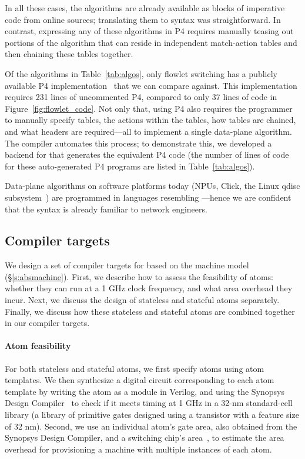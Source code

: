 In all these cases, the algorithms are already available as blocks of
imperative code from online sources; translating them to \pktlanguage syntax
was straightforward. In contrast, expressing any of these algorithms in P4
requires manually teasing out portions of the algorithm that can reside in
independent match-action tables and then chaining these tables together.

Of the algorithms in Table~\ref{tab:algos}, only flowlet switching has a
publicly available P4 implementation~\cite{p4_flowlet} that we can compare
against. This implementation requires 231 lines of uncommented P4, compared to
only 37 lines of \pktlanguage code in Figure~\ref{fig:flowlet_code}. Not only
that, using P4 also requires the programmer to manually specify tables, the
actions within the tables, how tables are chained, and what headers are
required---all to implement a single data-plane algorithm. The \pktlanguage
compiler automates this process; to demonstrate this, we developed a backend
for \pktlanguage that generates the equivalent P4 code (the number of lines of
code for these auto-generated P4 programs are listed in Table~\ref{tab:algos}).

Data-plane algorithms on software platforms today (NPUs, Click, the Linux qdisc
subsystem~\cite{qdisc})  are programmed in languages resembling
\pktlanguage---hence we are confident that the \pktlanguage syntax is already
familiar to network engineers.

\subsection{Compiler targets}
\label{ss:targets}

We design a set of compiler targets for \pktlanguage based on the
\absmachine machine model (\S\ref{s:absmachine}). First, we describe how to
assess the feasibility of atoms: whether they can run at a 1 GHz clock
frequency, and what area overhead they incur. Next, we discuss the
design of stateless and stateful atoms separately. Finally, we discuss how
these stateless and stateful atoms are combined together in our compiler
targets.

\paragraph{Atom feasibility}
For both stateless and stateful atoms, we first specify atoms using atom
templates. We then synthesize a digital circuit corresponding to each atom
template by writing the atom as a module in Verilog, and using the Synopsys
Design Compiler~\cite{synopsys_dc} to check if it meets timing at 1 GHz in a
32-nm standard-cell library (a library of primitive gates designed using a
transistor with a feature size of 32 nm).  Second, we use an individual atom's
gate area, also obtained from the Synopsys Design Compiler, and a switching
chip's area~\cite{gibb_parsing}, to estimate the area overhead for provisioning
a \absmachine machine with multiple instances of each atom.

